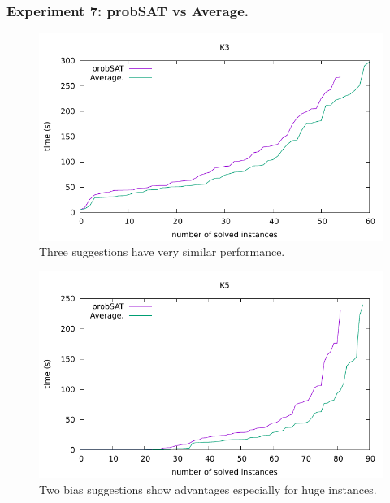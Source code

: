 \documentclass[12pt,a4paper,twoside]{scrartcl}
\numberwithin{equation}{section}
\begin{document}
\subsubsection{Experiment 7: probSAT vs Average.}   
  \begin{figure}[H]
\begin{center}
  \includegraphics[scale = 1]{DATA/K3/e4a.pdf}
  \end{center}
  \caption{Three suggestions have very similar performance.}
  \label{Experiment 6 k3-w cactus plot}
  \end{figure}
  \begin{figure}[H]
\begin{center}
  \includegraphics[scale = 1]{DATA/K5/e4a.pdf}
  \end{center}
  \caption{Two bias suggestions show advantages especially for huge instances.}
  \label{Experiment 6 k5-w cactus plot}
  \end{figure}
\end{document}
